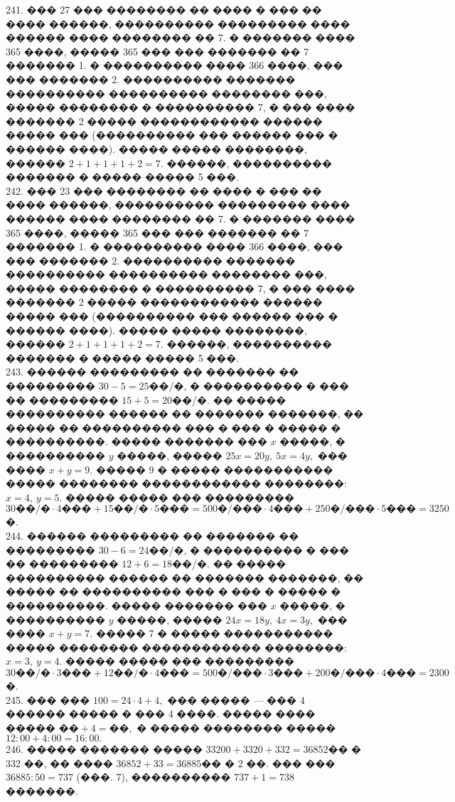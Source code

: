 \documentclass[12pt]{article}
\begin{document}
241. ��� 27 ��� �������� �� ���� � ��� �� ���� ������, ���������� ��������� ���� ������ ���� �������� �� 7. � ������� ���� 365 ����, ����� 365 ��� ��� ������� �� 7 ������� 1. � ���������� ���� 366 ����, ��� ��� ������� 2. ���������� ������� ���������� ���������� �������� ���, ����� �������� � ���������� 7, � ��� ���� ������� 2 ����� ������������ ������ ����� ��� (���������� ��� ������ ��� � ������ ����). ����� ����� ��������, ������ $2+1+1+1+2=7.$ ������, ���������� ������� � ����� ����� 5 ���. \\
242. ��� 23 ��� �������� �� ���� � ��� �� ���� ������, ���������� ��������� ���� ������ ���� �������� �� 7. � ������� ���� 365 ����, ����� 365 ��� ��� ������� �� 7 ������� 1. � ���������� ���� 366 ����, ��� ��� ������� 2. ���������� ������� ���������� ���������� �������� ���, ����� �������� � ���������� 7, � ��� ���� ������� 2 ����� ������������ ������ ����� ��� (���������� ��� ������ ��� � ������ ����). ����� ����� ��������, ������ $2+1+1+1+2=7.$ ������, ���������� ������� � ����� ����� 5 ���.\\
243. ������ ��������� �� ������� �� ��������� $30-5=25$��/�, � ���������� � ��� �� ��������� $15+5=20$��/�. �� ����� ���������� ������ �� ������� �������, �� ����� �� ���������� ��� � ��� � ����� � ����������. ����� ������� ��� $x$ �����, � ���������� $y$ �����, ����� $25x=20y,\ 5x=4y,$ ��� ���� $x+y=9.$ ����� 9 � ����� ����������� ����� �������� ������������ ��������: $x=4,\ y=5.$ ����� ����� ��� ��������� $30\text{��/�}\cdot4\text{���}+15\text{��/�}\cdot5\text{���}=500\text{�/���}\cdot4\text{���}+
250\text{�/���}\cdot5\text{���}=3250$�.\\
244. ������ ��������� �� ������� �� ��������� $30-6=24$��/�, � ���������� � ��� �� ��������� $12+6=18$��/�. �� ����� ���������� ������ �� ������� �������, �� ����� �� ���������� ��� � ��� � ����� � ����������. ����� ������� ��� $x$ �����, � ���������� $y$ �����, ����� $24x=18y,\ 4x=3y,$ ��� ���� $x+y=7.$ ����� 7 � ����� ����������� ����� �������� ������������ ��������: $x=3,\ y=4.$ ����� ����� ��� ��������� $30\text{��/�}\cdot3\text{���}+12\text{��/�}\cdot4\text{���}=500\text{�/���}\cdot3\text{���}+
200\text{�/���}\cdot4\text{���}=2300$�.\\
245. ��� ��� $100=24\cdot4+4,$ ��� ����� --- ��� 4 ������ ����� � ��� 4 ����. ����� ���� ����� $\text{��}+4=\text{��},$ � ����� �������� ����� $12:00+4:00=16:00.$\\
246. ����� ������� ����� $33200+3320+332=36852$�� � 332 ��, �� ���� $36852+33=36885$�� � 2 ��. ��� ��� $36885:50=737$ (���. 7), ���������� $737+1=738$ �������.\\
\end{document}
